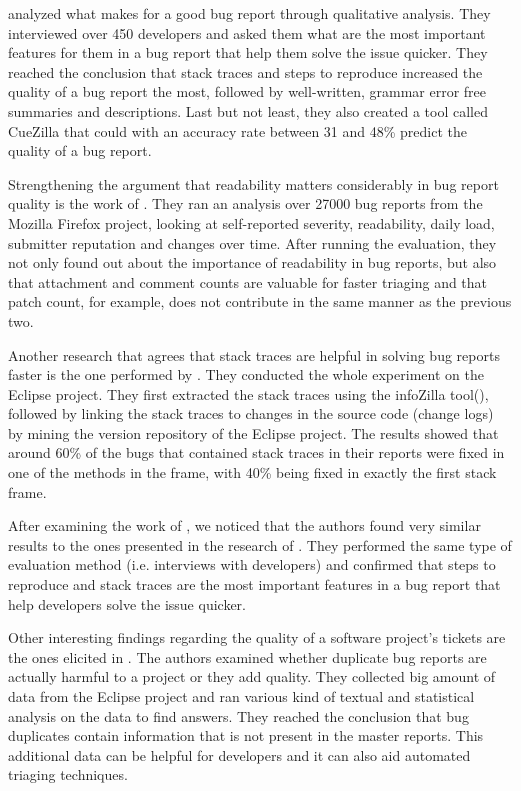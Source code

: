 \documentclass{mprop}
\begin{document}
\citet{bettenburg2008makes} analyzed what 
makes for a good bug report through qualitative analysis. They interviewed over
450 developers and asked them what are the most important features for them in
a bug report that help them solve the issue quicker. They reached the conclusion 
that stack traces and steps to reproduce increased the quality of a bug report 
the most, followed by well-written, grammar error free summaries and 
descriptions. Last but not least, they also created a tool called CueZilla that 
could with an accuracy rate between 31 and 48\% predict the quality of a bug 
report. 

Strengthening the argument that readability matters considerably in bug report 
quality is the work of \citet{hooimeijer2007modeling}. They ran an analysis over
27000 bug reports from the Mozilla Firefox project, looking at self-reported 
severity, readability, daily load, submitter reputation and changes over time. 
After running the evaluation, they not only found out about the importance of
readability in bug reports, but also that attachment and comment counts are 
valuable for faster triaging and that patch count, for example, does not
contribute in the same manner as the previous two.

Another research that agrees that stack traces are helpful in solving bug
reports faster is the one performed by \citet{schroter2010stack}. They conducted
the whole experiment on the Eclipse project. They first extracted the stack
traces using the infoZilla tool(\citep{bettenburg2008extracting}), followed by
linking the stack traces to changes in the source code (change logs) by mining
the version repository of the Eclipse project. The results showed that 
around 60\% of the bugs that contained stack traces in their reports were fixed
in one of the methods in the frame, with 40\% being fixed in exactly the first
stack frame.

After examining the work of \citet{bettenburg2007quality}, we noticed that
the authors found very similar results to the ones presented in the research of \citet{bettenburg2008makes}. 
They performed the same type of evaluation method (i.e. 
interviews with developers) and confirmed that steps to reproduce and stack traces
are the most important features in a bug report that help developers solve the
issue quicker.

Other interesting findings regarding the quality of a software project's tickets
are the ones elicited in \citet{bettenburg2008duplicate}. The authors examined
whether duplicate bug reports are actually harmful to a project or they add 
quality. They collected big amount of data from the Eclipse project and ran
various kind of textual and statistical analysis on the data to find answers.
They reached the conclusion that bug duplicates contain information that is not
present in the master reports. This additional data can be helpful for developers
and it can also aid automated triaging techniques.
\end{document}
